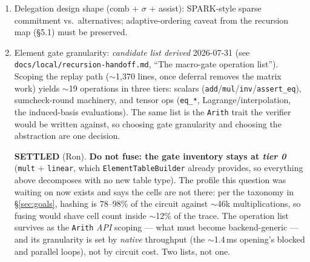 \documentclass[11pt]{article}
\newcommand{\code}[1]{\texttt{#1}}
\newcommand{\settled}[1]{\medskip\noindent\textbf{SETTLED} (#1).\xspace}
\theoremstyle{definition}
\begin{document}
\begin{enumerate}[nosep]
  \item Delegation design shape (comb + $\sigma$ + assist): SPARK-style
        sparse commitment vs.\ alternatives; adaptive-ordering caveat from
        the recursion map (\S5.1) must be preserved.
  \item Element gate granularity: \emph{candidate list derived}
        2026-07-31 (see \code{docs/local/recursion-handoff.md},
        ``The macro-gate operation list''). Scoping the replay path
        ($\sim$1{,}370 lines, once deferral removes the matrix work) yields
        $\sim$19 operations in three tiers: scalars
        (\code{add}/\code{mul}/\code{inv}/\code{assert\_eq}), sumcheck-round
        machinery, and tensor ops (\code{eq\_*}, Lagrange/interpolation, the
        induced-basis evaluations). The same list is the \code{Arith} trait
        the verifier would be written against, so choosing gate granularity
        and choosing the abstraction are one decision.

        \settled{Ron} \textbf{Do not fuse: the gate inventory stays at
        \emph{tier 0}} (\code{mult} + \code{linear}, which
        \code{ElementTableBuilder} already provides, so everything above
        decomposes with no new table type). The profile this question was
        waiting on now exists and says the cells are not there: per the
        taxonomy in \S\ref{sec:goals}, hashing is 78--98\% of the circuit
        against $\sim$46k multiplications, so fusing would shave cell count
        inside $\sim$12\% of the trace. The operation list survives as the
        \code{Arith} \emph{API} scoping --- what must become backend-generic
        --- and its granularity is set by \emph{native} throughput (the
        $\sim$1.4\,ms opening's blocked and parallel loops), not by circuit
        cost. Two lists, not one.


\end{enumerate}
\end{document}
